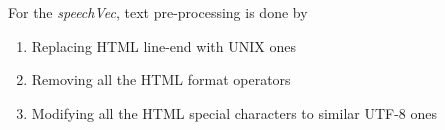 \documentclass{article}
\begin{document}
For the \textit{speechVec}, text pre-processing is done by 
\begin{enumerate}
\item
Replacing HTML line-end with UNIX ones 
\item
Removing all the HTML format operators
\item
Modifying all the HTML special characters to similar UTF-8 ones
\end{enumerate}

\newpage
\end{document}
